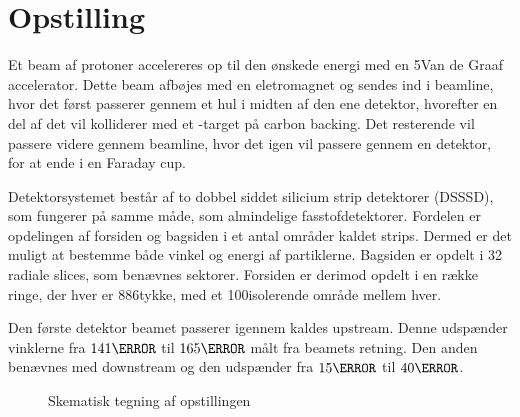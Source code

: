 \chapter{Opstilling}
\label{cha:opstilling}

Et beam af protoner accelereres op til den ønskede energi med en 5\MeV Van de Graaf
accelerator. Dette beam afbøjes med en eletromagnet og sendes ind i beamline, hvor det først
passerer gennem et hul i midten af den ene detektor, hvorefter en del af det vil kolliderer med et
-target på carbon backing.
Det resterende vil passere videre gennem beamline, hvor det
igen vil passere gennem en detektor, for at ende i en Faraday cup.

Detektorsystemet består af to dobbel siddet silicium strip detektorer (DSSSD), som fungerer på samme
måde, som almindelige fasstofdetektorer. Fordelen er opdelingen af forsiden og bagsiden i et antal
områder kaldet strips. Dermed er det muligt at bestemme både vinkel og energi af
partiklerne. Bagsiden er opdelt i 32 radiale slices, som benævnes sektorer. Forsiden er derimod
opdelt i en række ringe, der hver er 886\um tykke, med et 100\um isolerende område mellem hver.

Den første detektor beamet passerer igennem kaldes upstream. Denne udspænder vinklerne fra
$141\degree$ til $165\degree$ målt fra beamets retning. Den anden benævnes med downstream og den
udspænder fra $15\degree$ til $40\degree$.


\begin{figure}[h]
  \centering
  \caption{Skematisk tegning af opstillingen}
  \label{fig:opstilling}
\end{figure}
